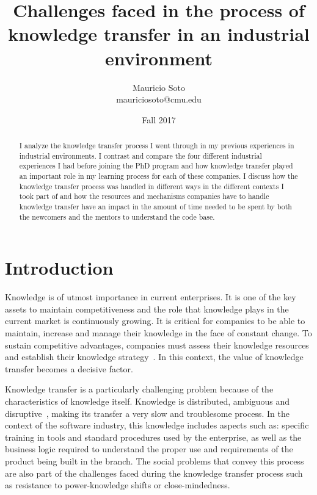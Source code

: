 \documentclass[12pt, letterpaper]{article}
\title{Challenges faced in the process of knowledge transfer in an industrial environment}
\author{Mauricio Soto\\
mauriciosoto@cmu.edu
}
\date{Fall 2017}
\begin{document}
 
\begin{titlepage}
\maketitle


\begin{abstract}
I analyze the knowledge transfer process I went through in my previous experiences in industrial environments.
I contrast and compare the four different industrial experiences I had before joining the PhD program and 
how knowledge transfer played an important role in my learning process for each of these companies.
I discuss how the knowledge transfer process was handled in different ways in the different contexts I took part
of and how the resources and mechanisms companies have to handle knowledge transfer have an impact in the 
amount of time needed to be spent by both the newcomers and the mentors to understand the code base. 
\end{abstract}
\end{titlepage}
 
\section{Introduction}

Knowledge is of utmost importance in current enterprises. It is one of the key assets to maintain competitiveness
and the role that knowledge plays in the current market is continuously growing. 
It is critical for companies to be able to maintain, increase and manage their knowledge in the face 
of constant change. To sustain competitive advantages, companies must assess their knowledge resources and 
establish their knowledge strategy~\cite{civi00}. In this context, the value of knowledge transfer 
becomes a decisive factor.

Knowledge transfer is a particularly challenging problem because of the characteristics of
knowledge itself. Knowledge is distributed, ambiguous and 
disruptive~\cite{Newell06}, making its transfer a very
slow and troublesome process. 
In the context of the software industry, this knowledge includes aspects such as: specific training in tools and standard procedures used by the enterprise, as well as the
business logic required to understand the proper use and requirements of the product being built
in the branch. The social problems that convey this process are also part of the challenges faced during the 
knowledge transfer process such as resistance to power-knowledge
shifts or close-mindedness.
\end{document}

